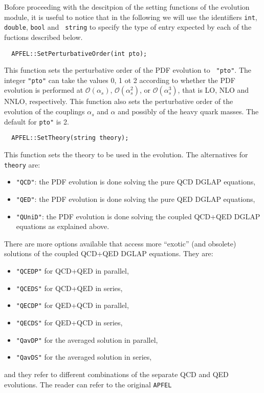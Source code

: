 \documentclass[11pt,a4paper]{article}
\begin{document}
Bofore proceeding with the descitpion of the setting functions of the
evolution module, it is useful to notice that in the following we will
use the identifiers {\tt int}, {\tt double}, {\tt bool} and {\tt
  string} to specify the type of entry expected by each of the
fuctions described below.

\begin{lstlisting}
  APFEL::SetPerturbativeOrder(int pto);
\end{lstlisting}
This function sets the perturbative order of the PDF evolution to {\tt
  "pto"}. The integer {\tt "pto"} can take the values 0, 1 ot 2
according to whether the PDF evolution is performed at
$\mathcal{O}(\alpha_s)$, $\mathcal{O}(\alpha_s^2)$, or
$\mathcal{O}(\alpha_s^3)$, that is LO, NLO and NNLO,
respectively. This function also sets the perturbative order of the
evolution of the couplings $\alpha_s$ and $\alpha$ and possibly of the
heavy quark masses. The default for {\tt pto"} is 2.
\begin{lstlisting}
  APFEL::SetTheory(string theory);
\end{lstlisting}
This function sets the theory to be used in the evolution. The
alternatives for {\tt theory} are:
\begin{itemize}
\item {\tt "QCD"}: the PDF evolution is done solving the pure QCD
  DGLAP equations,
\item {\tt "QED"}: the PDF evolution is done solving the pure QED
  DGLAP equations,
\item {\tt "QUniD"}: the PDF evolution is done solving the coupled
  QCD+QED DGLAP equations as explained above.
\end{itemize}
There are more options available that access more ``exotic'' (and
obsolete) solutions of the coupled QCD+QED DGLAP equations. They are:
\begin{itemize}
\item {\tt "QCEDP"} for QCD+QED in parallel,
\item {\tt "QCEDS"} for QCD+QED in series,
\item {\tt "QECDP"} for QED+QCD in parallel,
\item {\tt "QECDS"} for QED+QCD in series,
\item {\tt "QavDP"} for the averaged solution in parallel,
\item {\tt "QavDS"} for the averaged solution in series,
\end{itemize}
and they refer to different combinations of the separate QCD and QED
evolutions. The reader can refer to the original {\tt APFEL}
\end{document}
